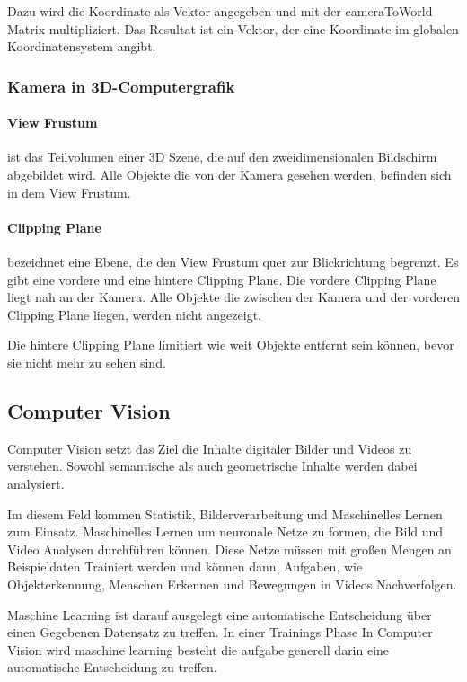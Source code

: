 Dazu wird die Koordinate als Vektor angegeben und mit der cameraToWorld Matrix multipliziert. Das Resultat ist ein Vektor, der eine Koordinate im globalen Koordinatensystem angibt.\citep{unitycameratoworldmatrix,unitymultiplyoint}

\subsubsection{Kamera in 3D-Computergrafik}
\paragraph{View Frustum}
ist das Teilvolumen einer 3D Szene, die auf den zweidimensionalen Bildschirm abgebildet wird. Alle Objekte die von der Kamera gesehen werden, befinden sich in dem View Frustum.

\paragraph{Clipping Plane}
bezeichnet eine Ebene, die den View Frustum quer zur Blickrichtung begrenzt. 
Es gibt eine vordere und eine hintere Clipping Plane.
Die vordere Clipping Plane liegt nah an der Kamera. Alle Objekte die zwischen der Kamera und der vorderen Clipping Plane liegen, werden nicht angezeigt.

Die hintere Clipping Plane limitiert wie weit Objekte entfernt sein können, bevor sie nicht mehr zu sehen sind.


\subsection{Computer Vision}
Computer Vision setzt das Ziel die Inhalte digitaler Bilder und Videos zu verstehen. Sowohl semantische als auch geometrische Inhalte werden dabei analysiert. 

Im diesem Feld kommen Statistik, Bilderverarbeitung und Maschinelles Lernen zum Einsatz. Maschinelles Lernen  um neuronale Netze zu formen, die Bild und Video Analysen durchführen können. Diese Netze müssen mit großen Mengen an Beispieldaten Trainiert werden und können dann, Aufgaben, wie Objekterkennung, Menschen Erkennen und Bewegungen in Videos Nachverfolgen.\citep{intortodeeplearingmedical}

Maschine Learning ist darauf ausgelegt eine automatische Entscheidung über einen Gegebenen Datensatz zu treffen. In einer Trainings Phase In Computer Vision wird maschine learning besteht die aufgabe generell darin eine automatische Entscheidung zu treffen. 


